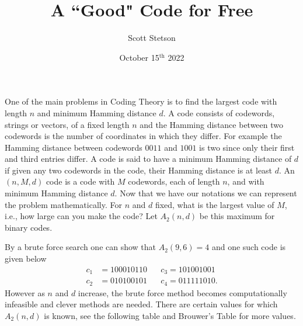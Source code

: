 \documentclass{article}
\title{A ``Good" Code for Free}
\author{Scott Stetson}
\date{October 15$^\text{th}$ 2022}
\theoremstyle{remark}
\begin{document}
	\maketitle
	One of the main problems in Coding Theory is to find the largest code with length $n$ and minimum Hamming distance $d$.  A code consists of codewords, strings or vectors, of a fixed length $n$ and the Hamming distance between two codewords is the number of coordinates in which they differ.  For example the Hamming distance between codewords $0011$ and $1001$ is two since only their first and third entries differ.  A code is said to have a minimum Hamming distance of $d$ if given any two codewords in the code, their Hamming distance is at least $d$.  An $(n,M,d)$ code is a code with $M$ codewords, each of length $n$, and with minimum Hamming distance $d$.
	Now that we have our notations we can represent the problem mathematically.  For $n$ and $d$ fixed, what is the largest value of $M$, i.e., how large can you make the code?  Let $A_2(n,d)$ be this maximum for binary codes.
	
	By a brute force search one can show that $A_2(9,6)=4$ and one such code is given below
	\begin{align*}
		c_1 & =100010110 \;\;\;\;\;\; c_3=101001001 \nonumber \\
		c_2 & =010100101 \;\;\;\;\;\; c_4=011111010.
	\end{align*}
	However as $n$ and $d$ increase, the brute force method becomes computationally infeasible and clever methods are needed.  There are certain values for which $A_2(n,d)$ is known, see the following table and Brouwer's Table \cite{Brouwer} for more values.
	
\end{document}
